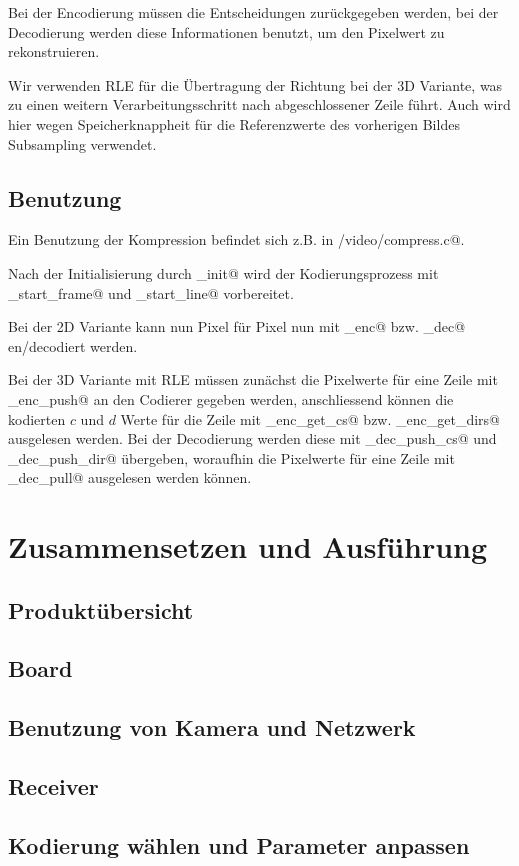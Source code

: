 Bei der Encodierung müssen die Entscheidungen zurückgegeben werden,
bei der Decodierung werden diese Informationen benutzt, um den Pixelwert zu 
rekonstruieren. 

Wir verwenden RLE für die Übertragung der Richtung bei der 3D Variante,
was zu einen weitern Verarbeitungsschritt nach abgeschlossener Zeile führt.
Auch wird hier wegen Speicherknappheit für die Referenzwerte des vorherigen Bildes
Subsampling verwendet.

\subsection{Benutzung}
Ein Benutzung der Kompression befindet sich z.B. in \verb@board/video/compress.c@.

Nach der Initialisierung durch \lstinline@cmpr_init@ 
wird der Kodierungsprozess mit \lstinline@cmpr_start_frame@ und
\lstinline@cmpr_start_line@ vorbereitet.

Bei der 2D Variante kann nun Pixel für Pixel nun mit 
\lstinline@cmpr_enc@ bzw. \lstinline@cmpr_dec@ en/decodiert werden.

Bei der 3D Variante mit RLE müssen zunächst die Pixelwerte für eine Zeile mit
_enc_push@ an den Codierer gegeben werden, anschliessend 
können die kodierten $c$ und $d$ Werte für die Zeile 
mit _enc_get_cs@ bzw. _enc_get_dirs@ ausgelesen werden.
Bei der Decodierung werden diese mit _dec_push_cs@ und 
_dec_push_dir@ übergeben, woraufhin die Pixelwerte
für eine Zeile mit _dec_pull@ ausgelesen werden können.


\section{Zusammensetzen und Ausführung}

\subsection{Produktübersicht}

\subsection{Board}

\subsection{Benutzung von Kamera und Netzwerk}

\subsection{Receiver}

\subsection{Kodierung wählen und Parameter anpassen}

